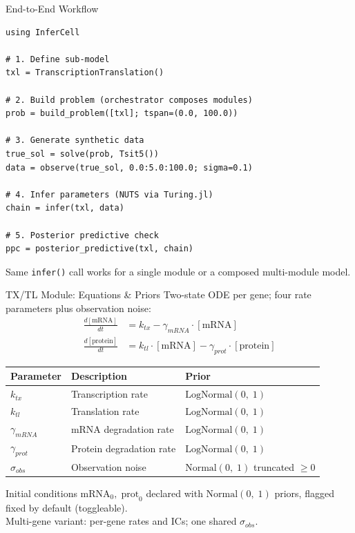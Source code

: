 \documentclass[aspectratio=169]{beamer}
\begin{document}
\begin{frame}{End-to-End Workflow}
	\begin{lstlisting}[style=julia]
using InferCell

# 1. Define sub-model
txl = TranscriptionTranslation()

# 2. Build problem (orchestrator composes modules)
prob = build_problem([txl]; tspan=(0.0, 100.0))

# 3. Generate synthetic data
true_sol = solve(prob, Tsit5())
data = observe(true_sol, 0.0:5.0:100.0; sigma=0.1)

# 4. Infer parameters (NUTS via Turing.jl)
chain = infer(txl, data)

# 5. Posterior predictive check
ppc = posterior_predictive(txl, chain)
	\end{lstlisting}

	\medskip
	{\small Same \texttt{infer()} call works for a single module or a composed multi-module model.}
\end{frame}



\begin{frame}[noframenumbering]{TX/TL Module: Equations \& Priors}
	\small
	Two-state ODE per gene; four rate parameters plus observation noise:
	\begin{align*}
		\frac{d[\text{mRNA}]}{dt} &= k_{tx} - \gamma_{mRNA} \cdot [\text{mRNA}] \\[6pt]
		\frac{d[\text{protein}]}{dt} &= k_{tl} \cdot [\text{mRNA}] - \gamma_{prot} \cdot [\text{protein}]
	\end{align*}

	\medskip
	\begin{tabular}{lll}
		\toprule
		\textbf{Parameter} & \textbf{Description} & \textbf{Prior} \\
		\midrule
		$k_{tx}$ & Transcription rate & $\text{LogNormal}(0,\;1)$ \\
		$k_{tl}$ & Translation rate & $\text{LogNormal}(0,\;1)$ \\
		$\gamma_{mRNA}$ & mRNA degradation rate & $\text{LogNormal}(0,\;1)$ \\
		$\gamma_{prot}$ & Protein degradation rate & $\text{LogNormal}(0,\;1)$ \\
		$\sigma_{obs}$ & Observation noise & $\text{Normal}(0,\;1)$ truncated $\geq 0$ \\
		\bottomrule
	\end{tabular}

	\medskip
	{\scriptsize Initial conditions $\text{mRNA}_0,\;\text{prot}_0$ declared with $\text{Normal}(0,\;1)$ priors, flagged fixed by default (toggleable).\\Multi-gene variant: per-gene rates and ICs; one shared $\sigma_{obs}$.}
\end{frame}
\end{document}
